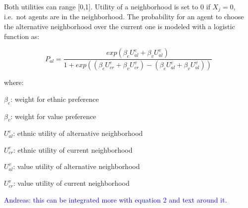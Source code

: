 \documentclass[
]{article}
\begin{document}
\par

Both utilities can range {[}0,1{]}. Utility of a neighborhood is set to
0 if \(X_j = 0\), i.e.~not agents are in the neighborhood. The
probability for an agent to choose the alternative neighborhood over the
current one is modeled with a logistic function as:

\begin{equation}
    P_{al} = \frac{exp(\beta_e U^e_{al} + \beta_v U^v_{al})}{1 + exp((\beta_e U^e_{cr} + \beta_v U^v_{cr}) - (\beta_e U^e_{al} + \beta_v U^v_{al}))}
    \label{eq:lgst}
\end{equation}

where:

\par

\(\beta_e\): weight for ethnic preference

\par

\(\beta_v\): weight for value preference

\par

\(U^e_{al}\): ethnic utility of alternative neighborhood

\par

\(U^e_{cr}\): ethnic utility of current neighborhood

\par

\(U^v_{al}\): value utility of alternative neighborhood

\par

\(U^v_{cr}\): value utility of current neighborhood

\par
\textcolor{blue}{{Andreas: }this can be integrated more with equation 2 and text around it.}
\end{document}
